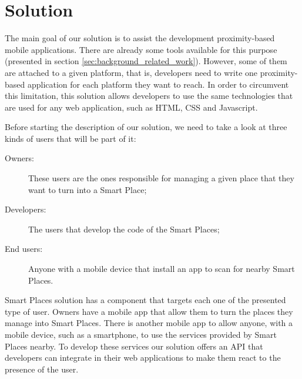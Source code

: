 
\chapter{Solution}
\label{chapter:solution}
The main goal of our solution is to assist
the development proximity-based mobile applications.
There are already some tools available for this purpose (presented in section \ref{sec:background_related_work}).
However, some of them are attached to a given platform, that is, developers
need to write one proximity-based application for each platform they want
to reach.
In order to circumvent this limitation, this solution allows developers
to use the same technologies that are used for any web application, such as \gls{HTML}, \gls{CSS} and Javascript.

Before starting the description of our solution, we need to take a look at three kinds of users that will be part of it:
\begin{description}
  \item[Owners:] These users are the ones responsible for managing a given place that they want to turn into a Smart Place;
  \item[Developers:] The users that develop the code of the Smart Places;
  \item[End users:] Anyone with a mobile device that install an app to scan for nearby Smart Places.
\end{description}

Smart Places solution has a component that targets each one of the presented type of user.
Owners have a mobile app that allow them to turn the places they manage into Smart Places.
There is another mobile app to allow anyone, with a mobile device, such as a smartphone, to use the services provided by Smart Places nearby.
To develop these services our solution offers an \gls{API} that developers can integrate in their web applications to make them react to the presence of the user.


